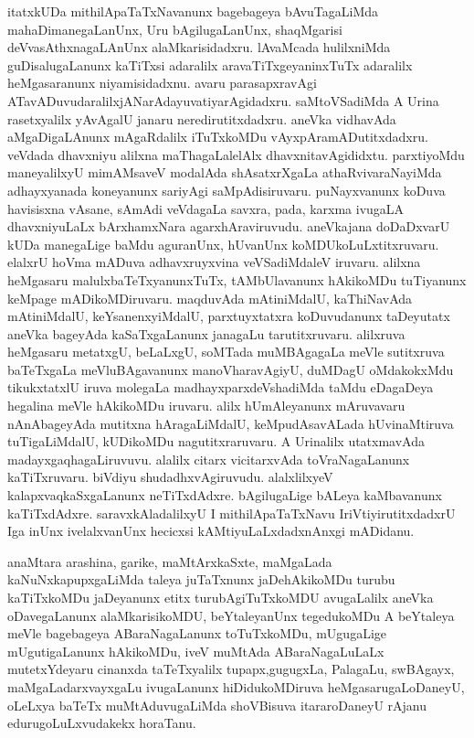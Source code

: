 \documentclass{article}
\begin{document}
\begin{mn}
itatxkUDa  mithilApaTaTxNavanunx  bagebageya  bAvuTagaLiMda  mahaDimanegaLanUnx,  Uru  bAgilugaLanUnx,  shaqMgarisi  deVvasAthxnagaLAnUnx  
alaMkarisidadxru.  lAvaMcada  hulilxniMda  guDisalugaLanunx  kaTiTxsi  adaralilx  aravaTiTxgeyaninxTuTx  adaralilx  heMgasaranunx  
niyamisidadxnu.  avaru  parasapxravAgi  ATavADuvudaralilxjANarAdayuvatiyarAgidadxru.  saMtoVSadiMda  A  Urina  rasetxyalilx  yAvAgalU  
janaru  neredirutitxdadxru.  aneVka  vidhavAda  aMgaDigaLAnunx  mAgaRdalilx  iTuTxkoMDu  vAyxpAramADutitxdadxru.  veVdada  dhavxniyu  
alilxna  maThagaLalelAlx  dhavxnitavAgididxtu.  parxtiyoMdu  maneyalilxyU  mimAMsaveV  modalAda  shAsatxrXgaLa  athaRvivaraNayiMda  
adhayxyanada  koneyanunx  sariyAgi  saMpAdisiruvaru.  puNayxvanunx  koDuva  havisisxna  vAsane,  sAmAdi  veVdagaLa  savxra,  pada,  
karxma  ivugaLA  dhavxniyuLaLx  bArxhamxNara  agarxhAraviruvudu.  aneVkajana  doDaDxvarU  kUDa  manegaLige  baMdu  aguranUnx,  hUvanUnx  
koMDUkoLuLxtitxruvaru.  elalxrU  hoVma mADuva  adhavxruyxvina  veVSadiMdaleV  iruvaru.  alilxna  heMgasaru  malulxbaTeTxyanunxTuTx,  
tAMbUlavanunx  hAkikoMDu  tuTiyanunx  keMpage  mADikoMDiruvaru.  maqduvAda  mAtiniMdalU,  kaThiNavAda  mAtiniMdalU,  keYsanenxyiMdalU,  
parxtuyxtatxra  koDuvudanunx  taDeyutatx  aneVka  bageyAda  kaSaTxgaLanunx  janagaLu  tarutitxruvaru.  alilxruva  heMgasaru  metatxgU,  
beLaLxgU,  soMTada  muMBAgagaLa  meVle  sutitxruva  baTeTxgaLa  meVluBAgavanunx  manoVharavAgiyU,  duMDagU  oMdakokxMdu  tikukxtatxlU  iruva  
molegaLa  madhayxparxdeVshadiMda  taMdu  eDagaDeya  hegalina  meVle  hAkikoMDu  iruvaru.  alilx  hUmAleyanunx  mAruvavaru  nAnAbageyAda  
mutitxna hAragaLiMdalU,  keMpudAsavALada  hUvinaMtiruva  tuTigaLiMdalU,  kUDikoMDu  nagutitxraruvaru.  A  Urinalilx  utatxmavAda  
madayxgaqhagaLiruvuvu.  alalilx  citarx vicitarxvAda  toVraNagaLanunx  kaTiTxruvaru.  biVdiyu  shudadhxvAgiruvudu.  alalxlilxyeV  
kalapxvaqkaSxgaLanunx  neTiTxdAdxre.  bAgilugaLige  bALeya  kaMbavanunx  kaTiTxdAdxre.  saravxkAladalilxyU  I  mithilApaTaTxNavu  
IriVtiyirutitxdadxrU  Iga  inUnx  ivelalxvanUnx  hecicxsi  kAMtiyuLaLxdadxnAnxgi  mADidanu.
\end{mn}

\begin{mn}
anaMtara  arashina,  garike,  maMtArxkaSxte,  maMgaLada  kaNuNxkapupxgaLiMda  taleya  juTaTxnunx  jaDehAkikoMDu  turubu  kaTiTxkoMDu  
jaDeyanunx  etitx  turubAgiTuTxkoMDU  avugaLalilx  aneVka  oDavegaLanunx  alaMkarisikoMDU,  beYtaleyanUnx  tegedukoMDu  A  beYtaleya  
meVle  bagebageya  ABaraNagaLanunx  toTuTxkoMDu,  mUgugaLige  mUgutigaLanunx  hAkikoMDu,  iveV  muMtAda  ABaraNagaLuLaLx  mutetxYdeyaru  
cinanxda  taTeTxyalilx  tupapx,gugugxLa,  PalagaLu,  swBAgayx,  maMgaLadarxvayxgaLu  ivugaLanunx  hiDidukoMDiruva  heMgasarugaLoDaneyU,  
oLeLxya  baTeTx  muMtAduvugaLiMda  shoVBisuva  itararoDaneyU  rAjanu  edurugoLuLxvudakekx  horaTanu.
\end{mn}
\end{document}
